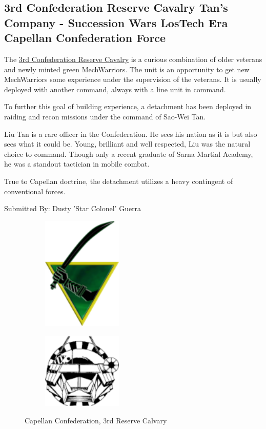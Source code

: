 \subsection{3rd Confederation Reserve Cavalry Tan's Company - Succession Wars LosTech Era Capellan Confederation Force}

The \href{https://www.sarna.net/wiki/3rd_Confederation_Reserve_Cavalry}{3rd Confederation Reserve Cavalry} is a curious combination of older veterans and newly minted green MechWarriors.
The unit is an opportunity to get new MechWarriors some experience under the supervision of the veterans.
It is usually deployed with another command, always with a line unit in command.

To further this goal of building experience, a detachment has been deployed in raiding and recon missions under the command of Sao-Wei Tan.

Liu Tan is a rare officer in the Confederation.
He sees his nation as it is but also sees what it could be.
Young, brilliant and well respected, Liu was the natural choice to command.
Though only a recent graduate of Sarna Martial Academy, he was a standout tactician in mobile combat.

True to Capellan doctrine, the detachment utilizes a heavy contingent of conventional forces.

Submitted By: Dusty 'Star Colonel' Guerra

\begin{figure}[!h]
  \begin{center}
  \begin{subfigure}{0.4\textwidth}
  \centering
  \includegraphics[alt='Capellan Confederation Logo', width=1.5in, height=2.139in]{img/Capellan-Confederation.png}
  \end{subfigure}
  \hspace{1in}
  \begin{subfigure}{0.4\textwidth}
  \centering
  \includegraphics[alt='3rd Reserve Calvary Logo', width=1.5in, height=1.431in]{img/3rd-Reserve-Calvary.png}
  \end{subfigure}
  \caption*{Capellan Confederation, 3rd Reserve Calvary}
  \end{center}
\end{figure}

